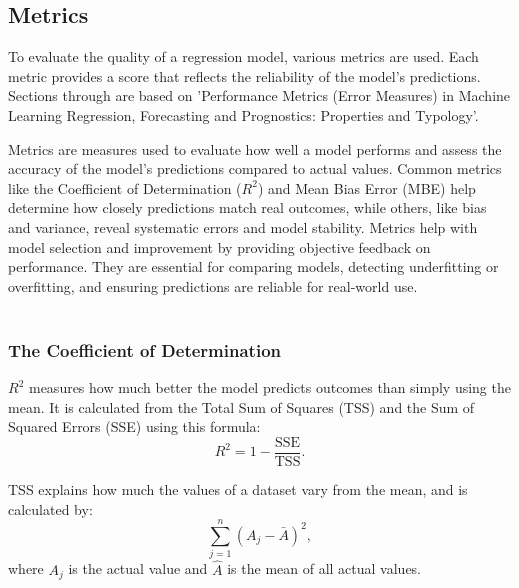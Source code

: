 \subsection{Metrics}
To evaluate the quality of a regression model, various metrics are used. Each metric provides a score that reflects the reliability of the model's predictions. Sections through are based on 'Performance Metrics (Error Measures) in Machine Learning Regression, Forecasting and Prognostics: Properties and Typology'\cite{metrics}. \newline

	\noindent Metrics are measures used to evaluate how well a model performs and assess the accuracy of the model’s predictions compared to actual values. Common metrics like the Coefficient of Determination ($R^{2}$) and Mean Bias Error (MBE) help determine how closely predictions match real outcomes, while others, like bias and variance, reveal systematic errors and model stability. Metrics help with model selection and improvement by providing objective feedback on performance. They are essential for comparing models, detecting underfitting or overfitting, and ensuring predictions are reliable for real-world use.
\\\\

\subsubsection{The Coefficient of Determination}
$R^2$ measures how much better the model predicts outcomes than simply using the mean. It is calculated from the Total Sum of Squares (TSS) and the Sum of Squared Errors (SSE) using this formula: 
\begin{equation}
R^2=1-\frac{\text{SSE}}{\text{TSS}}.
\end{equation}

\noindent TSS explains how much the values of a dataset vary from the mean, and is calculated by: 
\begin{equation}
\sum_{j=1}^{n}(A_j - \bar{A})^2,
\end{equation}
where $A_j$ is the actual value and $\hat{A}$ is the mean of all actual values.
\\\\

